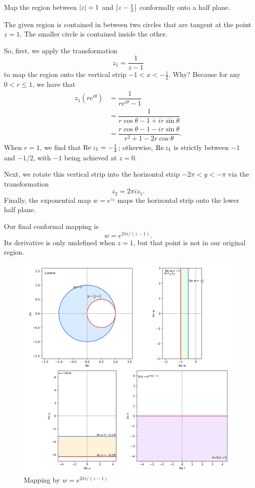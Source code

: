 \begin{exercise}
    Map the region between $\lvert z \rvert=1$ and $\left\lvert z-\frac{1}{2}\right \rvert$ conformally onto a half plane.

    \begin{sol}
        The given region is contained in between two circles that are tangent at the point $z=1$. The smaller circle is contained inside the other.

        So, first, we apply the transformation $$z_1=\dfrac{1}{z-1}$$ to map the region onto the vertical strip $-1<x<-\frac{1}{2}$. Why? Because for any $0<r \le 1$, we have that \begin{align*}
        z_1(re^{i \theta}) &=\dfrac{1}{re^{i\theta}-1} \\
        &=\dfrac{1}{r\cos \theta-1+ir\sin \theta} \\
        &=\dfrac{r\cos\theta-1-ir\sin \theta}{r^2+1-2r\cos \theta}.
        \end{align*}
        When $r=1$, we find that $\operatorname{Re} z_1=-\frac{1}{2}$; otherwise, $\operatorname{Re} z_1$ is strictly between $-1$ and $-1/2$, with $-1$ being achieved at $z=0$.

        Next, we rotate this vertical strip into the horizontal strip $-2\pi<y<-\pi$ via the transformation $$z_2=2\pi i z_1.$$ Finally, the exponential map $w=e^{z_2}$ maps the horizontal strip onto the lower half plane.

        Our final conformal mapping is $$\boxed{w=e^{2\pi i/(z-1)}}.$$ Its derivative is only undefined when $z=1$, but that point is not in our original region.
        \begin{figure}[h]
            \caption{Mapping by $w=e^{2\pi i/(z-1)}$}
            \centering
            \includegraphics[scale=0.65]{conformal-mapping.png}
        \end{figure}
    \end{sol}
\end{exercise}

